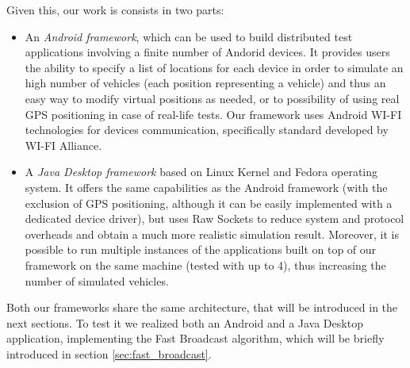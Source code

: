 Given this, our work is consists in two parts:
\begin{itemize}
	\item An \textit{Android framework}, which can be used to build distributed test applications involving a finite number of Andorid devices. It provides users the ability to specify a list of locations for each device in order to simulate an high number of vehicles (each position representing a vehicle) and thus an easy way to modify virtual positions as needed, or to possibility of using real GPS positioning in case of real-life tests. Our framework uses Android WI-FI technologies for devices communication, specifically \direct standard developed by WI-FI Alliance\textsuperscript{\texttrademark}.
	\item A \textit{Java Desktop framework} based on Linux Kernel and Fedora operating system. It offers the same capabilities as the Android framework (with the exclusion of GPS positioning, although it can be easily implemented with a dedicated device driver), but uses Raw Sockets to reduce system and protocol overheads and obtain a much more realistic simulation result. Moreover, it is possible to run multiple instances of the applications built on top of our framework on the same machine (tested with up to 4), thus increasing the number of simulated vehicles.
\end{itemize}

Both our frameworks share the same architecture, that will be introduced in the next sections. To test it we realized both an Android and a Java Desktop application, implementing the Fast Broadcast algorithm, which will be briefly introduced in section \ref{sec:fast_broadcast}.

